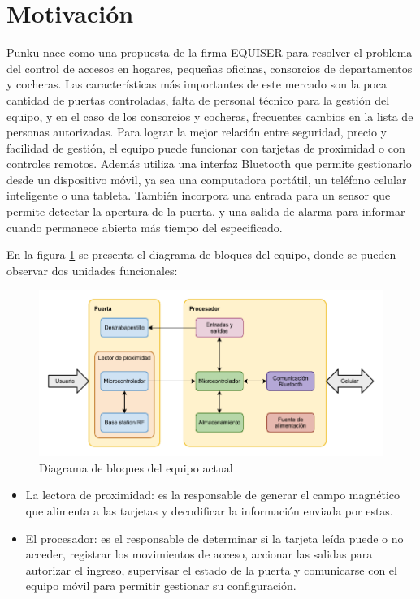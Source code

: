 \section{Motivación}
\label{sec:motivacion}

Punku nace como una propuesta de la firma EQUISER para resolver el problema del control de accesos en hogares, pequeñas oficinas, consorcios de departamentos y cocheras\cite{equiser_sistema_nodate}. Las características más importantes de este mercado son la poca cantidad de puertas controladas, falta de personal técnico para la gestión del equipo, y en el caso de los consorcios y cocheras, frecuentes cambios en la lista de personas autorizadas. Para lograr la mejor relación entre seguridad, precio y facilidad de gestión, el equipo puede funcionar con tarjetas de proximidad o con controles remotos. Además utiliza una interfaz Bluetooth que permite gestionarlo desde un dispositivo móvil, ya sea una computadora portátil, un teléfono celular inteligente o una tableta. También incorpora una entrada para un sensor que permite detectar la apertura de la puerta, y una salida de alarma para informar cuando permanece abierta más tiempo del especificado. 

En la figura \ref{fig:BloquesActual} se presenta el diagrama de bloques del equipo, donde se pueden observar dos unidades funcionales:

\begin{figure}[ht]
	\centering
	\includegraphics[width=\textwidth]{./Figures/BloquesActual.pdf}
	\caption{Diagrama de bloques del equipo actual}
	\label{fig:BloquesActual}
\end{figure}

\begin{itemize}
	\item La lectora de proximidad: es la responsable de generar el campo magnético que alimenta a las tarjetas y decodificar la información enviada por estas.
	\item El procesador: es el responsable de determinar si la tarjeta leída puede o no acceder, registrar los movimientos de acceso, accionar las salidas para autorizar el ingreso, supervisar el estado de la puerta y comunicarse con el equipo móvil para permitir gestionar su configuración.
\end{itemize}

